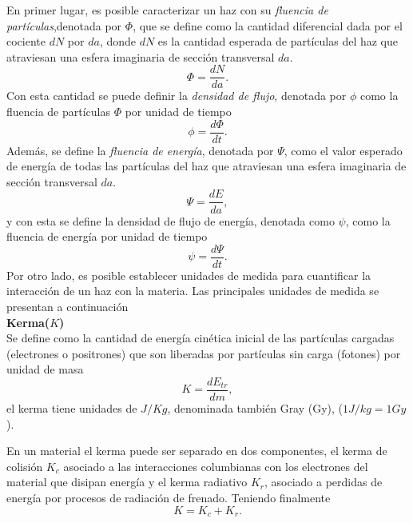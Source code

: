 En primer lugar, es posible caracterizar un haz con su \textit{fluencia de partículas},denotada por $\Phi $, que se define como la cantidad diferencial dada por el cociente $dN$ por $da$, donde $dN$ es la cantidad esperada de partículas del haz que atraviesan una esfera imaginaria de sección transversal $da$.
\begin{equation}
\Phi=\frac{dN}{da}.
\end{equation}   
Con esta cantidad se puede definir la \textit{densidad de flujo}, denotada por $\phi$ como la fluencia de partículas $\Phi$ por unidad de tiempo
\begin{equation}
\phi=\frac{d\Phi}{dt}.
\end{equation}
Además, se define la \textit{fluencia de energía}, denotada por $\Psi$, como el valor esperado de energía de todas las partículas del haz que atraviesan una esfera imaginaria de sección transversal $da$.
\begin{equation}
\Psi=\frac{dE}{da},
\end{equation}
y con esta se define la densidad de flujo de energía, denotada como $\psi$, como la fluencia de energía por unidad de tiempo
\begin{equation}
\psi=\frac{d\Psi}{dt}.
\end{equation}
Por otro lado, es posible establecer unidades de medida para cuantificar la interacción de un haz con la materia. Las principales unidades de medida se presentan a continuación\\

\noindent
\textbf{Kerma($K$)}\\

Se define como la cantidad de energía cinética inicial de las partículas cargadas (electrones o positrones) que son liberadas por partículas sin carga (fotones) por unidad de masa
\begin{equation}
K=\frac{dE_{tr}}{dm},
\end{equation}
el kerma tiene unidades de $J/Kg$, denominada también Gray (Gy), ($1J/kg=1Gy$).


En un material el kerma puede ser separado en dos componentes, el kerma de colisión $K_c$  asociado a las interacciones columbianas con los electrones del material que disipan energía y el kerma radiativo $K_r$, asociado a perdidas de energía por procesos de radiación de frenado. Teniendo finalmente 
\begin{equation}
	K=K_c+K_r.
\end{equation}\\

